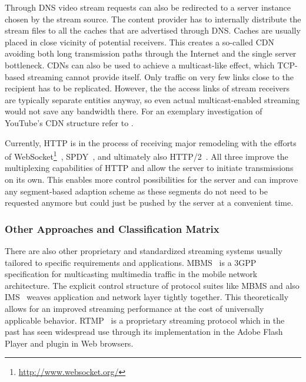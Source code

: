 Through \gls{DNS} video stream requests can also be redirected to a server instance chosen by the stream source. The content provider has to internally distribute the stream files to all the caches that are advertised through \gls{DNS}. Caches are usually placed in close vicinity of potential receivers. This creates a so-called \gls{CDN} avoiding both long transmission paths through the Internet and the single server bottleneck. \glspl{CDN} can also be used to achieve a multicast-like effect, which \gls{TCP}-based streaming cannot provide itself. Only traffic on very few links close to the recipient has to be replicated. However, the the access links of stream receivers are typically separate entities anyway, so even actual multicast-enabled streaming would not save any bandwidth there. For an exemplary investigation of YouTube's \gls{CDN} structure refer to \cite{rafetseder2011explyt}.

Currently, \gls{HTTP} is in the process of receiving major remodeling with the efforts of WebSocket\footnote{\url{http://www.websocket.org/}}~\cite{rfc6455}, SPDY~\cite{google2011SPDYdef,google2010SPDYwp}, and ultimately also HTTP/2~\cite{http20draft}. All three improve the multiplexing capabilities of \gls{HTTP} and allow the server to initiate transmissions on its own. This enables more control possibilities for the server and can improve any segment-based adaption scheme as these segments do not need to be requested anymore but could just be pushed by the server at a convenient time.

\subsubsection{Other Approaches and Classification Matrix}

There are also other proprietary and standardized streaming systems usually tailored to specific requirements and applications. \gls{MBMS}~\cite{3gpp.22.146,3gpp.22.246} is a \gls{3GPP} specification for multicasting multimedia traffic in the mobile network architecture. The explicit control structure of protocol suites like \gls{MBMS} and also \gls{IMS}~\cite{3gpp.23.228} weaves application and network layer tightly together. This theoretically allows for an improved streaming performance at the cost of universally applicable behavior. \gls{RTMP}~\cite{rtmpspec} is a proprietary streaming protocol which in the past has seen widespread use through its implementation in the Adobe Flash Player and plugin in Web browsers. 


